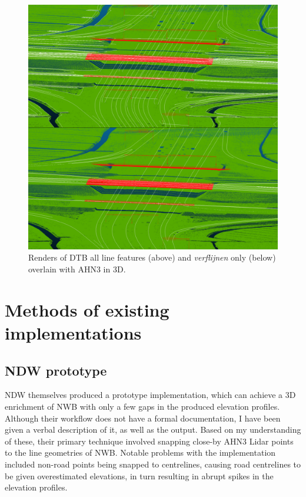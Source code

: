 \begin{figure}
    \centering
    \includegraphics[width=\linewidth]{final_report/figs/ahn_sample_10.png} 
    \caption{Renders of DTB all line features (above) and \textit{verflijnen} only (below) overlain with AHN3 in 3D.}
    \label{fig:dtbahn}
\end{figure}

\section{Methods of existing implementations}
\label{sec:methodsexisting}

\subsection{NDW prototype}
\label{sub:ndwprototype}

NDW themselves produced a prototype implementation, which can achieve a 3D enrichment of NWB with only a few gaps in the produced elevation profiles. Although their workflow does not have a formal documentation, I have been given a verbal description of it, as well as the output. Based on my understanding of these, their primary technique involved snapping close-by AHN3 Lidar points to the line geometries of NWB. Notable problems with the implementation included non-road points being snapped to centrelines, causing road centrelines to be given overestimated elevations, in turn resulting in abrupt spikes in the elevation profiles.

